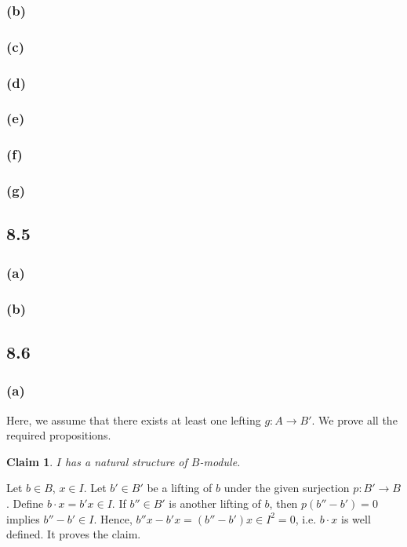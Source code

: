 \documentclass[11pt]{amsart}          %
\newtheorem*{claim}{Claim}
\begin{document}
\subsubsection*{(b)}
\subsubsection*{(c)}
\subsubsection*{(d)}
\subsubsection*{(e)}
\subsubsection*{(f)}
\subsubsection*{(g)}
\subsection*{8.5}
\subsubsection*{(a)}
\subsubsection*{(b)}


\subsection*{8.6}
\subsubsection*{(a)} Here, we assume that there exists at least one lefting $g: A \to B'$. We prove all the required propositions.

\begin{claim} $I$ has a natural structure of $B$-module.
\end{claim}

Let $b \in B$, $x \in I$. Let $b' \in B'$ be a lifting of $b$ under the given surjection $p: B' \to B$. Define $b \cdot x = b' x \in I$. If $b'' \in B'$ is another lifting of $b$, then $p(b'' - b') =0$ implies $b'' - b' \in I$. Hence, $b'' x - b' x = (b'' - b')x \in I^2 = 0$, i.e. $b \cdot x$ is well defined. It proves the claim.
\end{document}
